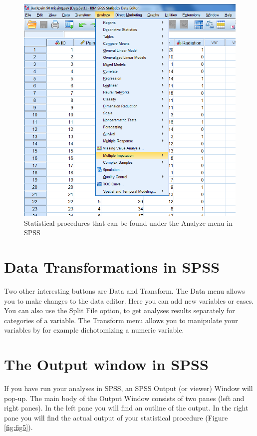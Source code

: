 \documentclass[]{book}
\theoremstyle{definition}
\theoremstyle{definition}
\theoremstyle{definition}
\theoremstyle{remark}
\begin{document}
\begin{figure}

{\centering \includegraphics[width=0.9\linewidth]{images/fig1.4} 

}

\caption{Statistical procedures that can be found under the Analyze menu in SPSS}\label{fig:fig4}
\end{figure}

\section{Data Transformations in
SPSS}\label{data-transformations-in-spss}

Two other interesting buttons are Data and Transform. The Data menu
allows you to make changes to the data editor. Here you can add new
variables or cases. You can also use the Split File option, to get
analyses results separately for categories of a variable. The Transform
menu allows you to manipulate your variables by for example
dichotomizing a numeric variable.

\section{The Output window in SPSS}\label{the-output-window-in-spss}

If you have run your analyses in SPSS, an SPSS Output (or viewer) Window
will pop-up. The main body of the Output Window consists of two panes
(left and right panes). In the left pane you will find an outline of the
output. In the right pane you will find the actual output of your
statistical procedure (Figure \ref{fig:fig5}).
\end{document}
